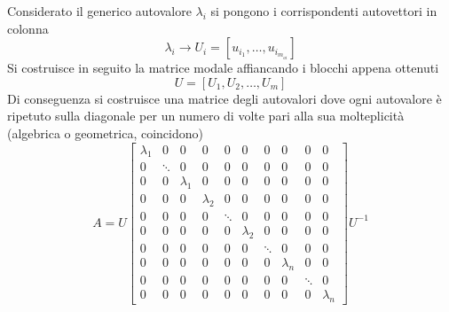 Considerato il generico autovalore $\lambda_i$ si pongono i corrispondenti
autovettori in colonna
$$
\lambda_i \rightarrow U_i=[u_{i_1},\ldots,u_{i_{m_{ai}}}]
$$
Si costruisce in seguito la matrice modale affiancando i blocchi appena ottenuti
$$
U = [U_1,U_2,\ldots,U_m]
$$
Di conseguenza si costruisce una matrice degli autovalori dove ogni autovalore
è ripetuto sulla diagonale per un numero di volte pari alla sua molteplicità
(algebrica o geometrica, coincidono)
$$
A=U
\begin{bmatrix}
\lambda_1 &0 &0 &0 &0 &0 &0 &0 &0 &0 \\
0    &\ddots &0 &0 &0 &0 &0 &0 &0 &0 \\
0 &0 &\lambda_1 &0 &0 &0 &0 &0 &0 &0 \\
0 &0 &0 &\lambda_2 &0 &0 &0 &0 &0 &0 \\
0 &0 &0 &0    &\ddots &0 &0 &0 &0 &0 \\
0 &0 &0 &0 &0 &\lambda_2 &0 &0 &0 &0 \\
0 &0 &0 &0 &0 &0    &\ddots &0 &0 &0 \\
0 &0 &0 &0 &0 &0 &0 &\lambda_n &0 &0 \\
0 &0 &0 &0 &0 &0 &0 &0    &\ddots &0 \\
0 &0 &0 &0 &0 &0 &0 &0 &0 &\lambda_n
\end{bmatrix}U^{-1}
$$
